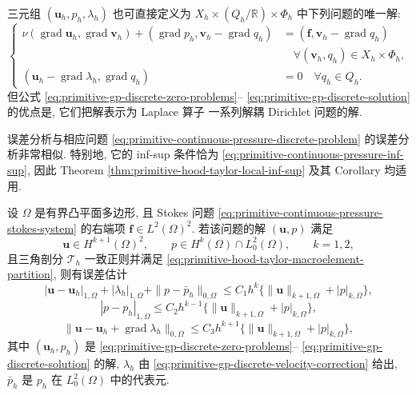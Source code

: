 \setcounter{statement}{4}
\renewcommand{\theHstatement}{remark.\thesection.\arabic{statement}}
\begin{Remark}\label{rem:primitive-gp-direct-three-field-formulation}
三元组 $(\mathbf u_h,p_h,\lambda_h)$ 也可直接定义为
$X_h\times(Q_h/\mathbb R)\times\Phi_h$ 中下列问题的唯一解:
\[
\left\{
\begin{aligned}
\nu(\operatorname{grad}\mathbf u_h,\operatorname{grad}\mathbf v_h)
+(\operatorname{grad}p_h,\mathbf v_h-\operatorname{grad}q_h)
&=(\mathbf f,\mathbf v_h-\operatorname{grad}q_h)\\
&\quad\forall(\mathbf v_h,q_h)\in X_h\times\Phi_h,\\
(\mathbf u_h-\operatorname{grad}\lambda_h,\operatorname{grad}q_h)&=0
\quad\forall q_h\in Q_h.
\end{aligned}
\right.
\]
但公式 \eqref{eq:primitive-gp-discrete-zero-problems}--
\eqref{eq:primitive-gp-discrete-solution} 的优点是, 它们把解表示为 Laplace 算子
一系列解耦 Dirichlet 问题的解.
\end{Remark}

误差分析与相应问题
\eqref{eq:primitive-continuous-pressure-discrete-problem} 的误差分析非常相似.
特别地, 它的 inf-sup 条件恰为
\eqref{eq:primitive-continuous-pressure-inf-sup}, 因此 Theorem
\ref{thm:primitive-hood-taylor-local-inf-sup} 及其 Corollary 均适用.

\setcounter{statement}{5}
\renewcommand{\theHstatement}{theorem.\thesection.\arabic{statement}}
\begin{Theorem}\label{thm:primitive-gp-error}
设 $\Omega$ 是有界凸平面多边形, 且 Stokes 问题
\eqref{eq:primitive-continuous-pressure-stokes-system} 的右端项
$\mathbf f\in L^2(\Omega)^2$. 若该问题的解 $(\mathbf u,p)$ 满足
\[
\mathbf u\in H^{k+1}(\Omega)^2,
\qquad p\in H^k(\Omega)\cap L_0^2(\Omega),
\qquad k=1,2,
\]
且三角剖分 $\mathcal T_h$ 一致正则并满足
\eqref{eq:primitive-hood-taylor-macroelement-partition}, 则有误差估计
\begin{equation}\label{eq:primitive-gp-primary-errors}
|\mathbf u-\mathbf u_h|_{1,\Omega}
+|\lambda_h|_{1,\Omega}
+\|p-\bar p_h\|_{0,\Omega}
\leq C_1h^k\{\|\mathbf u\|_{k+1,\Omega}+|p|_{k,\Omega}\},
\end{equation}
\begin{equation}\label{eq:primitive-gp-pressure-h1-error}
|p-p_h|_{1,\Omega}
\leq C_2h^{k-1}\{\|\mathbf u\|_{k+1,\Omega}+|p|_{k,\Omega}\},
\end{equation}
\begin{equation}\label{eq:primitive-gp-corrected-velocity-l2-error}
\|\mathbf u-\mathbf u_h+\operatorname{grad}\lambda_h\|_{0,\Omega}
\leq C_3h^{k+1}\{\|\mathbf u\|_{k+1,\Omega}+|p|_{k,\Omega}\},
\end{equation}
其中 $(\mathbf u_h,p_h)$ 是
\eqref{eq:primitive-gp-discrete-zero-problems}--
\eqref{eq:primitive-gp-discrete-solution} 的解, $\lambda_h$ 由
\eqref{eq:primitive-gp-discrete-velocity-correction} 给出, $\bar p_h$ 是
$p_h$ 在 $L_0^2(\Omega)$ 中的代表元.
\end{Theorem}

